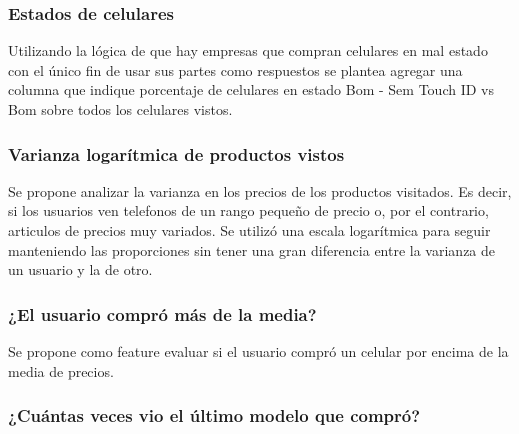 \documentclass[a4paper]{article}
\begin{document}
\subsubsection{Estados de celulares}

\begin{sloppypar}
	\texttt{}
\end{sloppypar}

Utilizando la lógica de que hay empresas que compran celulares en mal estado con el único fin de usar sus partes como respuestos se plantea agregar una columna que indique porcentaje de celulares en estado Bom - Sem Touch ID vs Bom sobre todos los celulares vistos.

\subsubsection{Varianza logarítmica de productos vistos}

\begin{sloppypar}
	\texttt{}
\end{sloppypar}

Se propone analizar la varianza en los precios de los productos visitados. Es decir, si los usuarios ven telefonos de un rango pequeño de precio o, por el contrario, articulos de precios muy variados. Se utilizó una escala logarítmica para seguir manteniendo las proporciones sin tener una gran diferencia entre la varianza de un usuario y la de otro.

\subsubsection{¿El usuario compró más de la media?}

\begin{sloppypar}
	\texttt{}
\end{sloppypar}

Se propone como feature evaluar si el usuario compró un celular por encima de la media de precios. 

\subsubsection{¿Cuántas veces vio el último modelo que compró?}

\begin{sloppypar}
	\texttt{}
\end{sloppypar}
\end{document}
